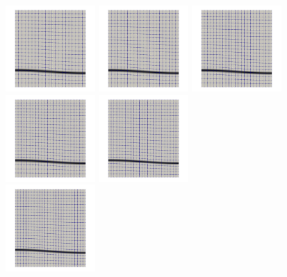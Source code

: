 \begin{center}
\includegraphics[width=3.42cm]{python_codes/fieldstone_25/images/mesh.0000.jpg}
\includegraphics[width=3.42cm]{python_codes/fieldstone_25/images/mesh.0001.jpg}
\includegraphics[width=3.42cm]{python_codes/fieldstone_25/images/mesh.0002.jpg}
\includegraphics[width=3.42cm]{python_codes/fieldstone_25/images/mesh.0003.jpg}
\includegraphics[width=3.42cm]{python_codes/fieldstone_25/images/mesh.0004.jpg}\\
\includegraphics[width=3.42cm]{python_codes/fieldstone_25/images/mesh.0005.jpg}

\end{center}
